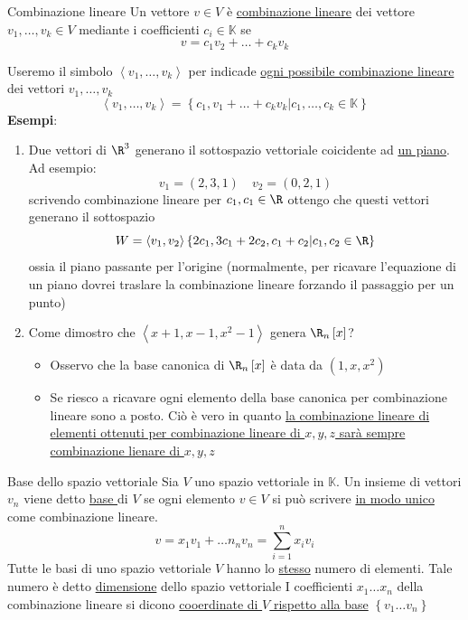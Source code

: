 \begin{definizione}{Combinazione lineare}
	Un vettore $v \in  V$ è \underline{combinazione lineare} dei vettore $ v_1,\ldots , v_k \in  V$ mediante i coefficienti $c_i \in  \mathbb{K}$ se
	\[
		v = c_1v_2+ \ldots + c_k v_k
	\]
\end{definizione}
Useremo il simbolo $ \left<v_1,\ldots,v_k \right>$ per indicade \underline{ogni possibile combinazione lineare} dei vettori $v_1,\ldots,v_k$
\[
	\left<v_1,\ldots , v_k	\right> = \left\{ c_1,v_1+\ldots+c_kv_k | c_1,\ldots,c_k \in  \mathbb{K}\right\}
\]
\textbf{Esempi}:
\begin{enumerate}
	\item Due vettori di $\R^{3}$ generano il sottospazio vettoriale coicidente ad \underline{un piano}. Ad esempio:
	      \[
		      v_1=\left( 2,3,1 \right) \quad v_2=\left( 0,2,1 \right)
	      \]
	      scrivendo combinazione lineare per $c_1,c_1 \in  \R$ ottengo che questi vettori generano il sottospazio
	      \[
		      W = \left<v_1,v_2 \right> \left\{ 2c_1,3c_1+2c_2,c_1+c_2 | c_1,c_2 \in  \R \right\}
	      \]
	      ossia il piano passante per l'origine (normalmente, per ricavare l'equazione di un piano dovrei traslare la combinazione lineare forzando il passaggio per un punto)
	\item Come dimostro che $\left<x+1,x-1, x^2-1 \right>$ genera $\R_n\left[ x \right] $?
	      \begin{itemize}
		      \item Osservo che la base canonica di $\R_n\left[ x \right] $ è data da $\left( 1,x,x^2 \right) $
		      \item Se riesco a ricavare ogni elemento della base canonica per combinazione lineare sono a posto. Ciò è vero in quanto \underline{la combinazione lineare di elementi ottenuti per combinazione lineare di $x,y,z$ sarà sempre combinazione lienare di $x,y,z$}
	      \end{itemize}
\end{enumerate}

\begin{definizione}{Base dello spazio vettoriale}
	Sia $V$ uno spazio vettoriale in $\mathbb{K}$. Un insieme di vettori  $v_n$ viene detto \underline{base }di $V$ se ogni elemento $v \in  V$ si può scrivere \underline{in modo unico} come combinazione lineare.
	\[
		v = x_1v_1 +\ldots n_nv_n = \sum_{i=1}^{n} x_iv_i
	\]
	Tutte le basi di uno spazio vettoriale $V$ hanno lo \underline{stesso} numero di elementi. Tale numero è detto \underline{dimensione} dello spazio vettoriale
	\vskip3mm
	I coefficienti $x_1 \ldots x_n$ della combinazione lineare si dicono \underline{cooerdinate di $V$ rispetto alla base} $\left\{ v_1\ldots v_n \right\} $
\end{definizione}

